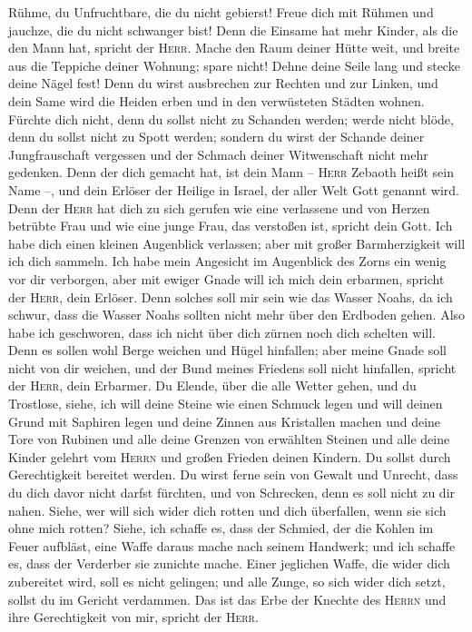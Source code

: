  Rühme, du Unfruchtbare, die du nicht gebierst! Freue dich
mit Rühmen und jauchze, die du nicht schwanger bist! Denn die Einsame
hat mehr Kinder, als die den Mann hat, spricht der \textsc{Herr}.
 Mache den Raum deiner Hütte weit, und breite aus die
Teppiche deiner Wohnung; spare nicht! Dehne deine Seile lang und stecke
deine Nägel fest!  Denn du wirst ausbrechen zur Rechten
und zur Linken, und dein Same wird die Heiden erben und in den
verwüsteten Städten wohnen.  Fürchte dich nicht, denn du
sollst nicht zu Schanden werden; werde nicht blöde, denn du sollst nicht
zu Spott werden; sondern du wirst der Schande deiner Jungfrauschaft
vergessen und der Schmach deiner Witwenschaft nicht mehr gedenken.
 Denn der dich gemacht hat, ist dein Mann -- \textsc{Herr}
Zebaoth heißt sein Name --, und dein Erlöser der Heilige in Israel, der
aller Welt Gott genannt wird.  Denn der \textsc{Herr} hat
dich zu sich gerufen wie eine verlassene und von Herzen betrübte Frau
und wie eine junge Frau, das verstoßen ist, spricht dein Gott.
 Ich habe dich einen kleinen Augenblick verlassen; aber
mit großer Barmherzigkeit will ich dich sammeln.  Ich habe
mein Angesicht im Augenblick des Zorns ein wenig vor dir verborgen, aber
mit ewiger Gnade will ich mich dein erbarmen, spricht der \textsc{Herr},
dein Erlöser.  Denn solches soll mir sein wie das Wasser
Noahs, da ich schwur, dass die Wasser Noahs sollten nicht mehr über den
Erdboden gehen. Also habe ich geschworen, dass ich nicht über dich
zürnen noch dich schelten will.  Denn es sollen wohl
Berge weichen und Hügel hinfallen; aber meine Gnade soll nicht von dir
weichen, und der Bund meines Friedens soll nicht hinfallen, spricht der
\textsc{Herr}, dein Erbarmer.  Du Elende, über die alle
Wetter gehen, und du Trostlose, siehe, ich will deine Steine wie einen
Schmuck legen und will deinen Grund mit Saphiren legen 
und deine Zinnen aus Kristallen machen und deine Tore von Rubinen und
alle deine Grenzen von erwählten Steinen  und alle deine
Kinder gelehrt vom \textsc{Herrn} und großen Frieden deinen Kindern.
 Du sollst durch Gerechtigkeit bereitet werden. Du wirst
ferne sein von Gewalt und Unrecht, dass du dich davor nicht darfst
fürchten, und von Schrecken, denn es soll nicht zu dir nahen.
 Siehe, wer will sich wider dich rotten und dich
überfallen, wenn sie sich ohne mich rotten?  Siehe, ich
schaffe es, dass der Schmied, der die Kohlen im Feuer aufbläst, eine
Waffe daraus mache nach seinem Handwerk; und ich schaffe es, dass der
Verderber sie zunichte mache.  Einer jeglichen Waffe, die
wider dich zubereitet wird, soll es nicht gelingen; und alle Zunge, so
sich wider dich setzt, sollst du im Gericht verdammen. Das ist das Erbe
der Knechte des \textsc{Herrn} und ihre Gerechtigkeit von mir, spricht
der \textsc{Herr}.

